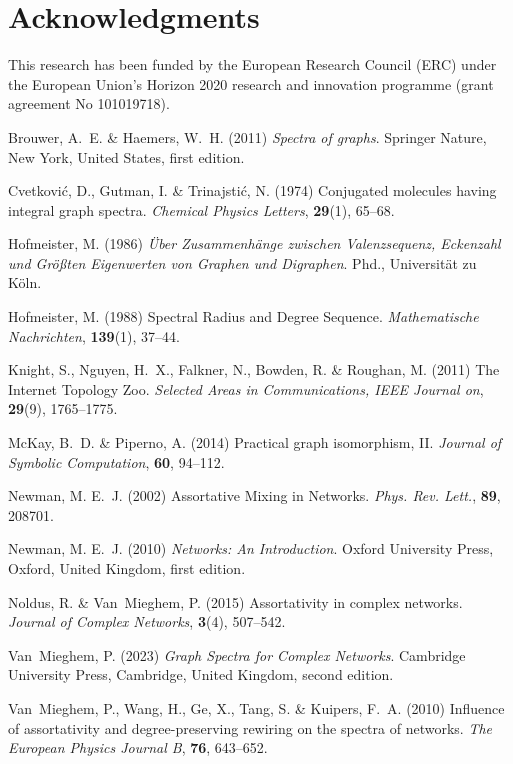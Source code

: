 \documentclass{comnet}%
\begin{document}
\section*{Acknowledgments}

This research has been funded by the European Research Council (ERC) under the European Union's Horizon 2020 research and innovation programme (grant agreement No 101019718).



\begin{thebibliography}{00}
	
	Brouwer, A.~E. {\&} Haemers, W.~H. (2011) {\em {Spectra of graphs}}.
	Springer Nature, New York, United States, first edition.
	
	Cvetkovi{\'c}, D., Gutman, I. {\&} Trinajsti{\'c}, N. (1974)  Conjugated
	molecules having integral graph spectra. {\em Chemical Physics Letters},
	\textbf{29}(1), 65--68.
	
	Hofmeister, M. (1986) {\em {\"U}ber {Z}usammenh{\"a}nge zwischen
		{V}alenzsequenz, {E}ckenzahl und {G}r{\"o}{\ss}ten {E}igenwerten von
		{G}raphen und {D}igraphen}.
	Phd., Universit{\"a}t zu K{\"o}ln.
	
	Hofmeister, M. (1988)  {Spectral Radius and Degree Sequence}. {\em
		Mathematische Nachrichten}, \textbf{139}(1), 37--44.
	
	Knight, S., Nguyen, H.~X., Falkner, N., Bowden, R. {\&} Roughan, M. (2011)
	{The Internet Topology Zoo}. {\em Selected Areas in Communications, IEEE
		Journal on}, \textbf{29}(9), 1765--1775.
	
	McKay, B.~D. {\&} Piperno, A. (2014)  {Practical graph isomorphism, II}. {\em
		Journal of Symbolic Computation}, \textbf{60}, 94--112.
	
	Newman, M. E.~J. (2002)  {Assortative Mixing in Networks}. {\em Phys. Rev.
		Lett.}, \textbf{89}, 208701.
	
	Newman, M. E.~J. (2010) {\em {Networks: An Introduction}}.
	Oxford University Press, Oxford, United Kingdom, first edition.
	
	Noldus, R. {\&} Van~Mieghem, P. (2015)  Assortativity in complex networks. {\em
		Journal of Complex Networks}, \textbf{3}(4), 507--542.
	
	Van~Mieghem, P. (2023) {\em {Graph Spectra for Complex Networks}}.
	Cambridge University Press, Cambridge, United Kingdom, second edition.
	
	Van~Mieghem, P., Wang, H., Ge, X., Tang, S. {\&} Kuipers, F.~A. (2010)
	Influence of assortativity and degree-preserving rewiring on the spectra of
	networks. {\em The European Physics Journal B}, \textbf{76}, 643--652.
	
\end{thebibliography}
\end{document}
